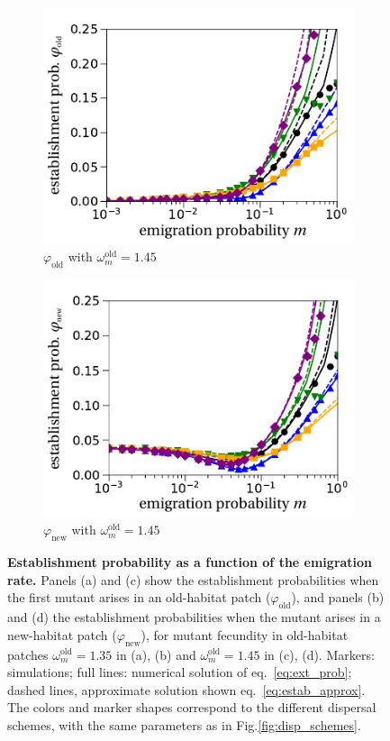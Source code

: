 \documentclass[11pt]{article}
\begin{document}
\begin{figure}[t!]
\begin{subfigure}{.5\textwidth}
  		\centering
  		\includegraphics[width=\linewidth]{fig2c.pdf}
  		\caption{$\varphi_{\text{old}}$ with $\omega^\text{old}_m = 1.45$}
  		\label{fig:vary_m_est_old-45}
	\end{subfigure}%
	\begin{subfigure}{.5\textwidth}
 		 \centering
 		 \includegraphics[width=\linewidth]{fig2d.pdf}
  		\caption{$\varphi_{\text{new}}$ with $\omega^\text{old}_m = 1.45$}
  		\label{fig:vary_m_est_new-45}		
	\end{subfigure}
	\caption{\textbf{Establishment probability as a function of the emigration rate.} \small Panels (a) and (c) show the establishment probabilities when the first mutant arises in an old-habitat patch ($\varphi_{\text{old}}$), and panels (b) and (d) the establishment probabilities when the mutant arises in a new-habitat patch ($\varphi_{\text{new}}$), for mutant fecundity in old-habitat patches $\omega^\text{old}_m=1.35$ in (a), (b) and $\omega^\text{old}_m=1.45$ in (c), (d). Markers: simulations; full lines: numerical solution of eq.~\eqref{eq:ext_prob}; dashed lines, approximate solution shown eq.~\eqref{eq:estab_approx}. The colors and marker shapes correspond to the different dispersal schemes, with the same parameters as in Fig.\ref{fig:disp_schemes}.}
	\label{fig:vary_m_est}
\end{figure}
\end{document}
